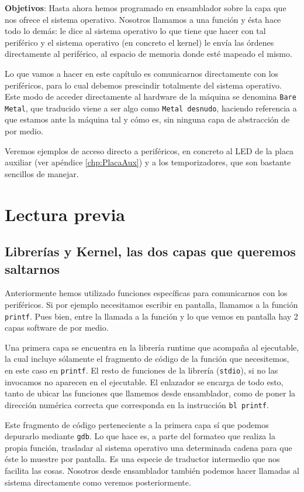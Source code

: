 \label{chp:EsBajo}
\minitoc

{\bf Objetivos}: Hasta ahora hemos programado en ensamblador sobre
la capa que nos ofrece el sistema operativo. Nosotros llamamos a una
función y ésta hace todo lo demás: le dice al sistema operativo lo
que tiene que hacer con tal periférico y el sistema operativo (en concreto
el kernel) le envía las órdenes directamente al periférico, al espacio
de memoria donde esté mapeado el mismo.

Lo que vamos a hacer en este capítulo es comunicarnos directamente con los
periféricos, para lo cual debemos prescindir totalmente del sistema operativo.
Este modo de acceder directamente al hardware de la máquina se denomina {\tt Bare Metal},
que traducido viene a ser algo como {\tt Metal desnudo}, haciendo referencia a
que estamos ante la máquina tal y cómo es, sin ninguna capa de abstracción de
por medio.

Veremos ejemplos de acceso directo a periféricos, en concreto al LED de la placa
auxiliar (ver apéndice \ref{chp:PlacaAux}) y a los temporizadores, que son
bastante sencillos de manejar.

\section{Lectura previa}

\subsection{Librerías y Kernel, las dos capas que queremos saltarnos}

Anteriormente hemos utilizado funciones específicas para
comunicarnos con los periféricos. Si por ejemplo necesitamos escribir
en pantalla, llamamos a la función {\tt printf}. Pues bien, entre
la llamada a la función y lo que vemos en pantalla hay 2 capas software
de por medio.

Una primera capa se encuentra en la librería runtime que acompaña al
ejecutable, la cual incluye sólamente el fragmento de código de la
función que necesitemos, en este caso en {\tt printf}. El resto de
funciones de la librería ({\tt stdio}), si no las invocamos no aparecen
en el ejecutable. El enlazador se encarga de todo esto, tanto de ubicar
las funciones que llamemos desde ensamblador, como de poner la dirección
numérica correcta que corresponda en la instrucción {\tt bl printf}.

Este fragmento de código perteneciente a la primera capa sí que podemos
depurarlo mediante {\tt gdb}. Lo que hace es, a parte del formateo que
realiza la propia función, trasladar al sistema operativo una determinada
cadena para que éste lo muestre por pantalla. Es una especie de traductor
intermedio que nos facilita las cosas. Nosotros desde ensamblador también
podemos hacer llamadas al sistema directamente como veremos posteriormente.

